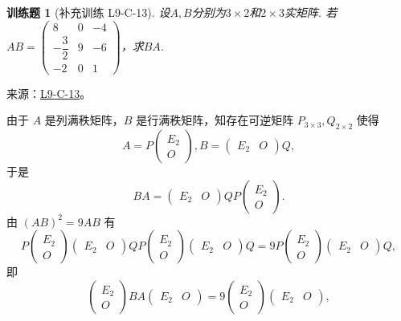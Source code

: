 \documentclass[12pt,fontset=fandol]{ctexart}
\newtheorem{exercise}{训练题}[section]
\begin{document}
\begin{exercise}[补充训练 L9-C-13]\label{prob:L9-C-13}
设$A,B$分别为$3 \times 2$和$2 \times 3$实矩阵. 若$AB=\begin{pmatrix}
                8             & 0 & -4 \\[1ex]
                -\dfrac{3}{2} & 9 & -6 \\[1ex]
                -2            & 0 & 1
            \end{pmatrix}$，求$BA$.
\end{exercise}
\noindent 来源：\href{https://github.com/yhwu-is/Linear-Algebra-Left-Undone/blob/new/%E8%AE%B2%E4%B9%89/%E4%B8%93%E9%A2%98/9%20%E7%9F%A9%E9%98%B5%E8%BF%90%E7%AE%97%E8%BF%9B%E9%98%B6.tex}{L9-C-13}。
\begin{solve}
由于 $A$ 是列满秩矩阵，$B$ 是行满秩矩阵，知存在可逆矩阵 $P_{3\times 3},Q_{2\times 2}$ 使得
            \[A=P\begin{pmatrix}E_2 \\ O\end{pmatrix},B=\begin{pmatrix}E_2 & O\end{pmatrix}Q,\]
            于是
            \[BA=\begin{pmatrix}E_2 & O\end{pmatrix}QP\begin{pmatrix}E_2 \\ O\end{pmatrix}.\]
            由 $(AB)^2=9AB$ 有 \[P\begin{pmatrix}E_2 \\ O\end{pmatrix}\begin{pmatrix}E_2 & O\end{pmatrix}QP\begin{pmatrix}E_2 \\ O\end{pmatrix}\begin{pmatrix}E_2 & O\end{pmatrix}Q=9P\begin{pmatrix}E_2 \\ O\end{pmatrix}\begin{pmatrix}E_2 & O\end{pmatrix}Q,\]
            即
            \[\begin{pmatrix}E_2 \\ O\end{pmatrix}BA\begin{pmatrix}E_2 & O\end{pmatrix}=9\begin{pmatrix}E_2 \\ O\end{pmatrix}\begin{pmatrix}E_2 & O\end{pmatrix},\]

\end{solve}
\end{document}
